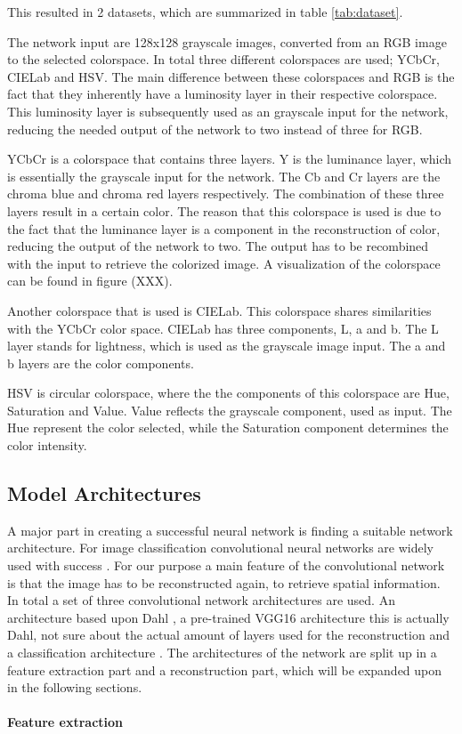 This resulted in 2 datasets, which are summarized in table \ref{tab:dataset}.

The network input are 128x128 grayscale images, converted from an RGB image to the selected colorspace. In total three different colorspaces are used; YCbCr, CIELab and HSV. The main difference between these colorspaces and RGB is the fact that they inherently have a luminosity layer in their respective colorspace. This luminosity layer is subsequently used as an grayscale input for the network, reducing the needed output of the network to two instead of three for RGB. 

YCbCr is a colorspace that contains three layers. Y is the luminance layer, which is essentially the grayscale input for the network. The Cb and Cr layers are the chroma blue and chroma red layers respectively. The combination of these three layers result in a certain color. The reason that this colorspace is used is due to the fact that the luminance layer is a component in the reconstruction of color, reducing the output of the network to two. The output has to be recombined with the input to retrieve the colorized image. A visualization of the colorspace can be found in figure (XXX).

Another colorspace that is used is CIELab. This colorspace shares similarities with the YCbCr color space. CIELab has three components, L, a and b. The L layer stands for lightness, which is used as the grayscale image input. The a and b layers are the color components. 

HSV is circular colorspace, where the the components of this colorspace are Hue, Saturation and Value. Value reflects the grayscale component, used as input. The Hue represent the color selected, while the Saturation component determines the color intensity. 

\subsection{Model Architectures}
A major part in creating a successful neural network is finding a suitable network architecture. For image classification convolutional neural networks are widely used with success \cite{Krizhevsky,Szegedy,Simonyan} . For our purpose a main feature of the convolutional network is that the image has to be reconstructed again, to retrieve spatial information. In total a set of three convolutional network architectures are used. An architecture based upon Dahl \cite{Dahl}, a pre-trained VGG16 \cite{Simonyan} architecture {\color{red} this is actually Dahl,  not sure about the actual amount of layers used for the reconstruction} and a classification architecture \cite{Zhang}. The architectures of the network are split up in a feature extraction part and a reconstruction part, which will be expanded upon in the following sections.\\ 
\\%
\textbf{Feature extraction}

